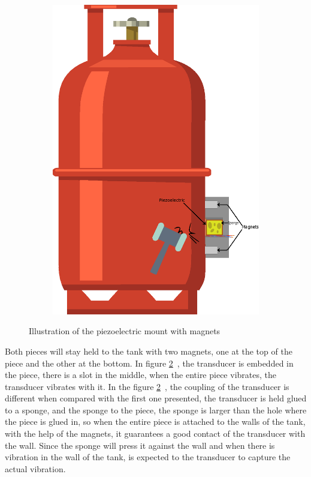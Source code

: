 \begin{figure}[]
\begin{subfigure}{0.3\textwidth}
        \includegraphics[width=\linewidth]{Chapters/4CHP/Figures/PiezoMagnets.eps}
        \caption{}{}
        \label{subfig:piezosponge}
    \end{subfigure}
    \caption{Illustration of the piezoelectric mount with magnets}{}
    \label{fig:coupPiezo}
\end{figure}
Both pieces will stay held to the tank with two magnets, one at the top of the piece and the other at the bottom. In figure \ref{fig:coupPiezo}~, the transducer is embedded in the piece, there is a slot in the middle, when the entire piece vibrates, the transducer vibrates with it. In the figure \ref{fig:coupPiezo}~, the coupling of the transducer is different when compared with the first one presented, the transducer is held glued to a sponge, and the sponge to the piece, the sponge is larger than the hole where the piece is glued in, so when the entire piece is attached to the walls of the tank, with the help of the magnets, it guarantees a good contact of the transducer with the wall. Since the sponge will press it against the wall and when there is vibration in the wall of the tank, is expected to the transducer to capture the actual vibration. 


\clearpage
